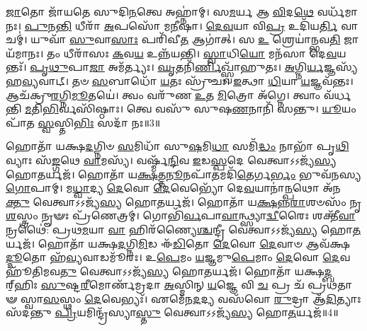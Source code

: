 \-\ul{𑌜𑌾}\-𑌤𑍋 𑌜𑌾᳴𑌯𑌤𑍇 𑌸𑍁𑌦𑌿\-\ul{𑌨}\-𑌤𑍍𑌵𑍇 𑌅𑌹𑍍𑌨𑌾॑𑌮𑍍।
𑌸\-\ul{𑌮}\-𑌰𑍍𑌯 𑌆 \ul{𑌵𑌿}\-𑌦\-\ul{𑌥𑍇} 𑌵𑌰𑍍𑌧᳴𑌮𑌾𑌨𑌃।
\-\ul{𑌪𑍁}\-𑌨\-\ul{𑌨𑍍𑌤𑌿} 𑌧𑍀𑌰𑌾᳴ \ul{𑌅}\-𑌪𑌸𑍋᳴ 𑌮\-\ul{𑌨𑍀}\-𑌷𑌾।
\-\ul{𑌦𑍇}\-\-\ul{𑌵}\-𑌯𑌾 𑌵𑌿\-\ul{𑌪𑍍𑌰} 𑌉𑌦𑌿᳴𑌯\-\ul{𑌰𑍍𑌤𑌿} 𑌵𑌾𑌚𑌮𑍍॑।
𑌯𑍁𑌵𑌾᳴ \ul{𑌸𑍁}\-𑌵𑌾\-\ul{𑌸𑌾𑌃} 𑌪𑌰𑌿᳴𑌵𑍀\-\ul{𑌤} 𑌆𑌗𑌾॑𑌤𑍍।
𑌸 \ul{𑌉} 𑌶𑍍𑌰𑍇𑌯𑌾॑𑌨𑍍𑌭𑌵\-\ul{𑌤𑌿} 𑌜𑌾𑌯᳴𑌮𑌾𑌨𑌃।
𑌤𑌂 𑌧𑍀𑌰𑌾᳴𑌸𑌃 \ul{𑌕}\-𑌵\-\ul{𑌯} 𑌉𑌨𑍍𑌨᳴𑌯𑌨𑍍𑌤𑌿।
\-\ul{𑌸𑍍𑌵𑌾}\-𑌧𑌿\-\ul{𑌯𑍋} 𑌮𑌨᳴𑌸𑌾 𑌦𑍇\-\ul{𑌵}\-𑌯𑌨𑍍𑌤𑌃᳴।
\-\ul{𑌪𑍃}\-\-\ul{𑌥𑍁}\-𑌪𑌾\-\ul{𑌜𑌾} 𑌅𑌮᳴𑌰𑍍𑌤𑍍𑌯𑌃।
\-\ul{𑌘𑍃}\-𑌤𑌨𑌿᳴\-\ul{𑌰𑍍𑌣𑌿}\-𑌖𑍍𑌸𑍍𑌵𑌾᳴𑌹𑍁𑌤𑌃।
\-\ul{𑌅}\-𑌗𑍍𑌨𑌿\-\ul{𑌰𑍍𑌯}\-𑌜𑍍𑌞𑌸𑍍𑌯᳴ 𑌹\-\ul{𑌵𑍍𑌯}\-𑌵𑌾𑌟𑍍।
𑌤𑍞 \ul{𑌸}\-𑌬𑌾𑌧𑍋᳴ \ul{𑌯}\-𑌤𑌃 𑌸𑍍𑌰𑍁᳴𑌚𑌃।
\-\ul{𑌇}\-𑌤𑍍𑌥𑌾 \ul{𑌧𑌿}\-𑌯𑌾 \ul{𑌯}\-𑌜𑍍𑌞𑌵᳴𑌨𑍍𑌤𑌃।
𑌆𑌚᳴𑌕𑍍𑌰𑍁\-\ul{𑌰}\-𑌗𑍍𑌨𑌿\-\ul{𑌮𑍂}\-𑌤𑌯𑍇॑।
𑌤𑍍𑌵𑌂 𑌵𑌰𑍁᳴𑌣 \ul{𑌉}\-𑌤 \ul{𑌮𑌿}\-𑌤𑍍𑌰𑍋 𑌅᳴𑌗𑍍𑌨𑍇।
𑌤𑍍𑌵𑌾𑌂 𑌵᳴𑌰𑍍𑌧𑌨𑍍𑌤𑌿 \ul{𑌮}\-𑌤𑌿\-\ul{𑌭𑌿}\-𑌰𑍍𑌵𑌸𑌿᳴𑌷𑍍𑌠𑌾𑌃।
𑌤𑍍𑌵𑍇 𑌵𑌸𑍁᳴ 𑌸𑍁𑌷\-\ul{𑌣}\-𑌨𑌾𑌨𑌿᳴ 𑌸𑌨𑍍𑌤𑍁।
\-\ul{𑌯𑍂}\-𑌯𑌂 𑌪𑌾᳴𑌤 \ul{𑌸𑍍𑌵}\-𑌸𑍍𑌤𑌿\-\ul{𑌭𑌿𑌃} 𑌸𑌦𑌾᳴ 𑌨𑌃॥3॥\anuvakamend[\-\ul{𑌸𑍁}\-𑌵𑍀\-\ul{𑌰𑌂} 𑌦𑍁\-\ul{𑌵𑌃} 𑌸𑍍𑌵𑌾᳴𑌹𑍁\-\ul{𑌤𑍋}\-\-𑌽𑌷𑍍𑌟𑍗 𑌚᳴]

𑌹𑍋𑌤𑌾᳴ 𑌯𑌕𑍍𑌷\-\ul{𑌦}\-𑌗𑍍𑌨𑌿𑍞 \ul{𑌸}\-𑌮𑌿𑌧𑌾᳴ 𑌸𑍁\-\ul{𑌷}\-𑌮𑌿\-\ul{𑌧𑌾} 𑌸𑌮𑌿᳴\-\ul{𑌦𑍍𑌧𑌂} 𑌨𑌾𑌭𑌾᳴ 𑌪𑍃\-\ul{𑌥𑌿}\-𑌵𑍍𑌯𑌾𑌃 𑌸᳴\-\ul{𑌙𑍍𑌗}\-𑌥𑍇 \ul{𑌵𑌾}\-𑌮𑌸𑍍𑌯᳴।
𑌵𑌰𑍍𑌷𑍍𑌮᳴\-\ul{𑌨𑍍𑌦𑌿}\-𑌵 \ul{𑌇}\-𑌡\-\ul{𑌸𑍍𑌪}\-𑌦𑍇 𑌵𑍇𑌤𑍍𑌵𑌾𑌽𑌽𑌜𑍍𑌯᳴\-\ul{𑌸𑍍𑌯} 𑌹𑍋\-\ul{𑌤}\-𑌰𑍍𑌯𑌜᳴।
𑌹𑍋𑌤𑌾᳴ 𑌯\-\ul{𑌕𑍍𑌷}\-𑌤𑍍𑌤\-\ul{𑌨𑍂}\-𑌨𑌪𑌾᳴\-\ul{𑌤}\-𑌮𑌦𑌿᳴\-\ul{𑌤𑍇}\-𑌰𑍍𑌗\-\ul{𑌰𑍍𑌭𑌂} 𑌭𑍁𑌵᳴𑌨𑌸𑍍𑌯 \ul{𑌗𑍋}\-𑌪𑌾𑌮𑍍।
𑌮\-\ul{𑌧𑍍𑌵𑌾}\-𑌦𑍍𑌯 \ul{𑌦𑍇}\-𑌵𑍋 \ul{𑌦𑍇}\-𑌵𑍇𑌭𑍍𑌯𑍋᳴ 𑌦𑍇\-\ul{𑌵}\-𑌯𑌾𑌨𑌾॑\-\ul{𑌨𑍍𑌪}\-𑌥𑍋 𑌅᳴𑌨\-\ul{𑌕𑍍𑌤𑍁} 𑌵𑍇𑌤𑍍𑌵𑌾𑌽𑌽𑌜𑍍𑌯᳴\-\ul{𑌸𑍍𑌯} 𑌹𑍋\-\ul{𑌤}\-𑌰𑍍𑌯𑌜᳴।
𑌹𑍋𑌤𑌾᳴ 𑌯\-\ul{𑌕𑍍𑌷}\-𑌨𑍍𑌨\-\ul{𑌰𑌾}\-𑌶𑍞𑌸𑌂᳴ 𑌨𑍃\-\ul{𑌶}\-𑌸𑍍𑌤𑍍𑌰𑌂 𑌨𑍄𑍟𑌃 𑌪𑍍𑌰᳴𑌣𑍇𑌤𑍍𑌰𑌮𑍍।
𑌗𑍋𑌭𑌿᳴\-\ul{𑌰𑍍𑌵}\-𑌪𑌾\-\ul{𑌵𑌾}\-𑌨𑍍𑌥𑍍𑌸𑍍𑌯𑌾\-\ul{𑌦𑍍𑌵𑍀}\-𑌰𑍈𑌃 𑌶𑌕𑍍𑌤𑍀᳴\-\ul{𑌵𑌾}\-𑌨𑍍𑌰𑌥𑍈॑: 𑌪𑍍𑌰𑌥\-\ul{𑌮}\-𑌯𑌾 \ul{𑌵𑌾} 𑌹𑌿𑌰᳴𑌣𑍍𑌯𑍈\-\ul{𑌶𑍍𑌚}\-𑌨𑍍𑌦𑍍𑌰𑍀 𑌵𑍇𑌤𑍍𑌵𑌾𑌽𑌽𑌜𑍍𑌯᳴\-\ul{𑌸𑍍𑌯} 𑌹𑍋\-\ul{𑌤}\-𑌰𑍍𑌯𑌜᳴।
𑌹𑍋𑌤𑌾᳴ 𑌯𑌕𑍍𑌷\-\ul{𑌦}\-𑌗𑍍𑌨𑌿\-\ul{𑌮𑌿}\-𑌡 𑌈᳴\-\ul{𑌡𑌿}\-𑌤𑍋 \ul{𑌦𑍇}\-𑌵𑍋 \ul{𑌦𑍇}\-𑌵𑌾𑍞 𑌆𑌵᳴𑌕𑍍𑌷\-\ul{𑌦𑍍𑌦𑍂}\-𑌤𑍋 𑌹᳴\-\ul{𑌵𑍍𑌯}\-𑌵𑌾𑌡𑌮𑍂᳴𑌰𑌃।
𑌉\-\ul{𑌪𑍇}\-𑌮𑌂 \ul{𑌯}\-𑌜𑍍𑌞𑌮𑍁\-\ul{𑌪𑍇}\-𑌮𑌾𑌂 \ul{𑌦𑍇}\-𑌵𑍋 \ul{𑌦𑍇}\-𑌵𑌹𑍂᳴𑌤𑌿𑌮𑌵\-\ul{𑌤𑍁} 𑌵𑍇𑌤𑍍𑌵𑌾𑌽𑌽𑌜𑍍𑌯᳴\-\ul{𑌸𑍍𑌯} 𑌹𑍋\-\ul{𑌤}\-𑌰𑍍𑌯𑌜᳴।
𑌹𑍋𑌤𑌾᳴ 𑌯𑌕𑍍𑌷\-\ul{𑌦𑍍𑌬}\-𑌰𑍍‌॒\mbox{}𑌹𑌿𑌃 \ul{𑌸𑍁}\-𑌷𑍍𑌟\-\ul{𑌰𑍀}\-𑌮𑍋𑌰𑍍𑌣᳴𑌮𑍍𑌰𑌦𑌾 \ul{𑌅}\-𑌸𑍍𑌮𑌿𑌨𑍍 \ul{𑌯}\-𑌜𑍍𑌞𑍇 𑌵𑌿 \ul{𑌚} 𑌪𑍍𑌰 𑌚᳴ 𑌪𑍍𑌰𑌥𑌤𑌾𑍟 𑌸𑍍𑌵𑌾\-\ul{𑌸}\-𑌸𑍍𑌥𑌂 \ul{𑌦𑍇}\-𑌵𑍇𑌭𑍍𑌯𑌃᳴।
𑌏𑌮𑍇᳴𑌨\-\ul{𑌦}\-𑌦𑍍𑌯 𑌵𑌸᳴𑌵𑍋 \ul{𑌰𑍁}\-𑌦𑍍𑌰𑌾 𑌆᳴\-\ul{𑌦𑌿}\-𑌤𑍍𑌯𑌾𑌃 𑌸᳴𑌦𑌨𑍍𑌤𑍁 \ul{𑌪𑍍𑌰𑌿}\-𑌯𑌮𑌿𑌨𑍍𑌦𑍍𑌰᳴𑌸𑍍𑌯𑌾\-\ul{𑌸𑍍𑌤𑍁} 𑌵𑍇𑌤𑍍𑌵𑌾𑌽𑌽𑌜𑍍𑌯᳴\-\ul{𑌸𑍍𑌯} 𑌹𑍋\-\ul{𑌤}\-𑌰𑍍𑌯𑌜᳴॥4॥

